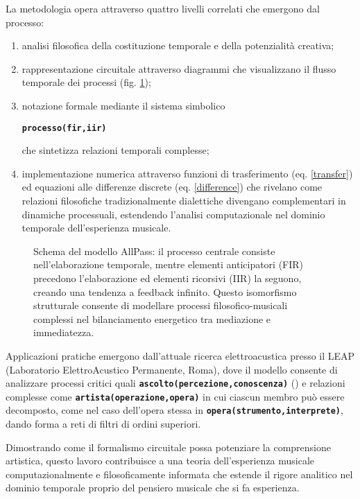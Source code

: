 \documentclass{../../lib/gs}
\newcommand{\apf}[3]{\textbf{\texttt{#1(#2,#3)}}}
\newcommand{\apfc}[3]{\begin{center}\apf{#1}{#2}{#3}\end{center}}
\begin{document}
La metodologia opera attraverso quattro livelli correlati che emergono dal processo:
\begin{enumerate}[nosep]
  \item analisi filosofica della costituzione temporale e della potenzialità creativa;
  \item rappresentazione circuitale attraverso diagrammi che visualizzano il flusso temporale dei processi (fig. \ref{apf});
  \item notazione formale mediante il sistema simbolico
    \apfc{processo}{fir}{iir}
    che sintetizza relazioni temporali complesse;
  \item implementazione numerica attraverso funzioni di trasferimento (eq. \ref{transfer}) ed equazioni alle differenze discrete (eq. \ref{difference}) che rivelano come relazioni filosofiche tradizionalmente dialettiche divengano complementari in dinamiche processuali, estendendo l'analisi computazionale nel dominio temporale dell'esperienza musicale.
\end{enumerate}

\begin{figure}[htbp]
\begin{center}
\caption{Schema del modello AllPass: il processo centrale consiste nell'elaborazione temporale, mentre elementi anticipatori (FIR) precedono l'elaborazione ed elementi ricorsivi (IIR) la seguono, creando una tendenza a feedback infinito. Questo isomorfismo strutturale consente di modellare processi filosofico-musicali complessi nel bilanciamento energetico tra mediazione e immediatezza.}
\label{apf}
\end{center}
\end{figure}

Applicazioni pratiche emergono dall'attuale ricerca elettroacustica presso il LEAP (Laboratorio ElettroAcustico Permanente, Roma), dove il modello consente di analizzare processi critici quali \apf{ascolto}{percezione}{conoscenza} (\cite{diScipio2003}) e relazioni complesse come \apf{artista}{operazione}{opera} in cui ciascun membro può essere decomposto, come nel caso dell'opera stessa in \apf{opera}{strumento}{interprete}, dando forma a reti di filtri di ordini superiori.

Dimostrando come il formalismo circuitale possa potenziare la comprensione artistica, questo lavoro contribuisce a una teoria dell'esperienza musicale computazionalmente e filosoficamente informata che estende il rigore analitico nel dominio temporale proprio del pensiero musicale che si fa esperienza.
\end{document}
